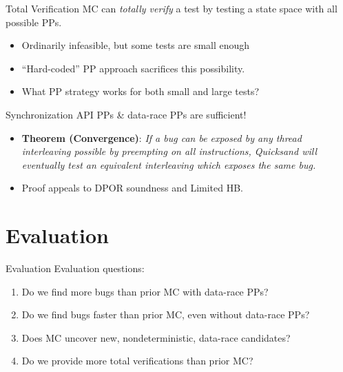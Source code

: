 \documentclass[xcolor=dvipsnames]{beamer}
\begin{document}
\begin{frame}{Total Verification}
	MC can {\em totally verify} a test by testing a state space with all possible PPs.
	\begin{itemize}
		\item Ordinarily infeasible, but some tests are small enough
		\item ``Hard-coded'' PP approach sacrifices this possibility.
		\item What PP strategy works for both small and large tests?
	\end{itemize}
	\pause
	\linegap

	Synchronization API PPs \& data-race PPs are sufficient!
	\begin{itemize}
		\item {\bf Theorem (Convergence)}:
			{\em If a bug can be exposed by any thread interleaving
				possible by preempting on all instructions,
			Quicksand will eventually test an equivalent interleaving which exposes the same bug.}
		\item Proof appeals to DPOR soundness and Limited HB.
	\end{itemize}
\end{frame}



\section{Evaluation}


\begin{frame}{Evaluation}
	Evaluation questions:
	\begin{enumerate}
		\item Do we find more bugs than prior MC with data-race PPs?
		\item Do we find bugs faster than prior MC, even without data-race PPs?
		\item Does MC uncover new, nondeterministic, data-race candidates?
		\item Do we provide more total verifications than prior MC?
	\end{enumerate}
\end{frame}
\end{document}
